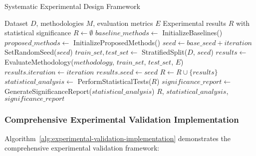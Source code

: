 \begin{algorithm}[!htbp]
\caption{Systematic Experimental Design Framework}
\label{alg:experimental-design}
\begin{algorithmic}[1]
\Require Dataset $D$, methodologies $M$, evaluation metrics $E$
\Ensure Experimental results $R$ with statistical significance
\State $R \leftarrow \emptyset$
\State $baseline\_methods \leftarrow$ InitializeBaselines()
\State $proposed\_methods \leftarrow$ InitializeProposedMethods()
        \State $seed \leftarrow base\_seed + iteration$
        \State SetRandomSeed($seed$)
        \State $train\_set, test\_set \leftarrow$ StratifiedSplit($D$, $seed$)
        \State $results \leftarrow$ EvaluateMethodology($methodology$, $train\_set$, $test\_set$, $E$)
        \State $results.iteration \leftarrow iteration$
        \State $results.seed \leftarrow seed$
        \State $R \leftarrow R \cup \{results\}$
    \EndFor
\EndFor
\State $statistical\_analysis \leftarrow$ PerformStatisticalTests($R$)
\State $significance\_report \leftarrow$ GenerateSignificanceReport($statistical\_analysis$)
\Return $R$, $statistical\_analysis$, $significance\_report$
\end{algorithmic}
\end{algorithm}

\subsubsection{Comprehensive Experimental Validation Implementation}

Algorithm~\ref{alg:experimental-validation-implementation} demonstrates the comprehensive experimental validation framework:

